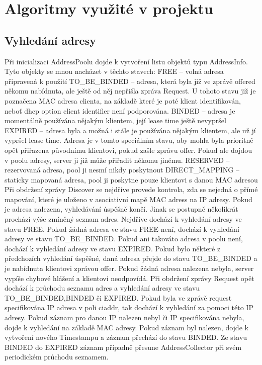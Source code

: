 \documentclass[12pt,a4paper]{report}
\begin{document}
\chapter{Algoritmy využité v projektu}
\section{Vyhledání adresy}
Při inicializaci AddressPoolu dojde k vytvoření listu objektů typu AddressInfo. Tyto objekty se mnou nacházet v těchto stavech: 
FREE – volná adresa připravená k použití 
TO\_BE\_BINDED – adresa, která byla již ve zprávě offered někomu nabídnuta, ale ještě od něj nepřišla zpráva Request. U tohoto stavu již je poznačena MAC adresa clienta, na základě které je poté klient identifikován, neboť dhcp option client identifier není podporována. 
BINDED – adresa je momentálně používána nějakým klientem, její lease time ještě nevypršel
EXPIRED – adresa byla a možná i stále je používána nějakým klientem, ale už jí vypršel lease time. Adresa je v tomto speciálním stavu, aby mohla byla prioritně opět přiřazena původnímu klientovi, pokud zašle zprávu offer. Pokud ale dojdou v poolu adresy, server ji již může přiřadit někomu jinému.
RESERVED – rezervovaná adresa, pool ji nesmí nikdy poskytnout
DIRECT\_MAPPING – staticky mapovaná adresa, pool ji poskytne pouze klientovi s danou MAC adresou
Při obdržení zprávy Discover se nejdříve provede kontrola, zda se nejedná o přímé mapování, které je uloženo v asociativní mapě MAC adress na IP adresy. Pokud je adresa nalezena, vyhledávání úspěšně končí. Jinak se postupně několikrát prochází výše zmíněný seznam adres. Nejdříve dochází k vyhledání adresy ve stavu FREE. Pokud žádná adresa ve stavu FREE není, dochází k vyhledání adresy ve stavu TO\_BE\_BINDED. Pokud ani takováto adresa v poolu není, dochází k vyhledání adresy ve stavu EXPIRED. Pokud bylo některé z předchozích vyhledání úspěšné, daná adresa přejde do stavu TO\_BE\_BINDED a je nabídnuta klientovi zprávou offer. Pokud žádná adresa nalezena nebyla, server vypíše chybové hlášení a klientovi neodpovídá. 
Při obdržení zprávy Request opět dochází k průchodu seznamu adres a vyhledání adresy ve stavu TO\_BE\_BINDED,BINDED či EXPIRED. Pokud byla ve zprávě request specifikována IP adresa v poli ciaddr, tak dochází k vyhledání za pomoci této IP adresy. Pokud záznam pro danou IP nalezen nebyl či IP specifikována nebyla, dojde k vyhledání na základě MAC adresy. Pokud záznam byl nalezen, dojde k vytvoření nového Timestampu a záznam přechází do stavu BINDED.  Ze stavu BINDED do EXPIRED záznam případně přesune AddressCollector při svém periodickém průchodu seznamem.
\end{document}
